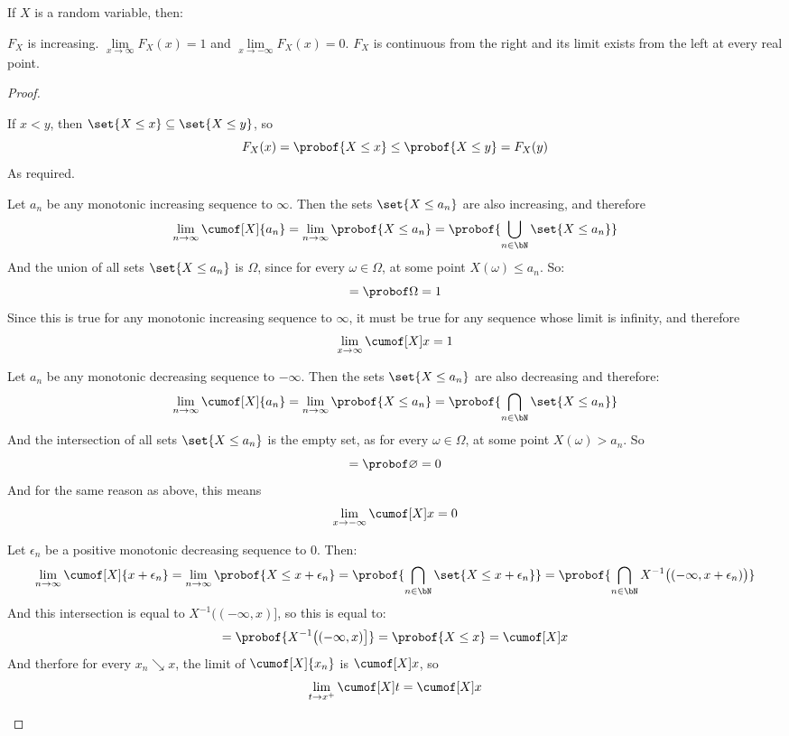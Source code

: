 \begin{prop*}

	If $X$ is a random variable, then:

	\begin{msecenumerate}
		\mitem $F_X$ is increasing.
		\mitem $\lim\limits_{x\to\infty} F_X(x)=1$ and $\lim\limits_{x\to-\infty} F_X(x)=0$.
		\mitem $F_X$ is continuous from the right and its limit exists from the left at every real point.
	\end{msecenumerate}

\end{prop*}

\begin{proof}

	\begin{msecenumerate}[0pt]
		\mitem If $x<y$, then $\set{X\leq x}\subseteq\set{X\leq y}$, so
			\[ F_X(x) = \probof{X\leq x} \leq \probof{X\leq y} = F_X(y) \]
			As required.

		\mitem Let $a_n$ be any monotonic increasing sequence to $\infty$.
			Then the sets $\set{X\leq a_n}$ are also increasing, and therefore
			\[ \lim_{n\to\infty} \cumof[X]{a_n} = \lim_{n\to\infty}\probof{X\leq a_n} = \probof{\bigcup_{n\in\bN}\set{X\leq a_n}} \]
			And the union of all sets $\set{X\leq a_n}$ is $\Omega$, since for every $\omega\in\Omega$, at some point $X(\omega)\leq a_n$.
			So:
			\[ = \probof\Omega = 1 \]
			Since this is true for any monotonic increasing sequence to $\infty$, it must be true for any sequence whose limit is infinity,
			and therefore
			\[ \lim_{x\to\infty} \cumof[X]x = 1 \]

			Let $a_n$ be any monotonic decreasing sequence to $-\infty$.
			Then the sets $\set{X\leq a_n}$ are also decreasing and therefore:
			\[ \lim_{n\to\infty}\cumof[X]{a_n} = \lim_{n\to\infty}\probof{X\leq a_n} = \probof{\bigcap_{n\in\bN}\set{X\leq a_n}} \]
			And the intersection of all sets $\set{X\leq a_n}$ is the empty set, as for every $\omega\in\Omega$, at some point $X(\omega)>a_n$.
			So
			\[ = \probof\varnothing = 0 \]
			And for the same reason as above, this means
			\[ \lim_{x\to-\infty}\cumof[X]x = 0 \]

		\mitem Let $\epsilon_n$ be a positive monotonic decreasing sequence to $0$.
			Then:
			\[ \lim_{n\to\infty}\cumof[X]{x+\epsilon_n} = \lim_{n\to\infty}\probof{X\leq x+\epsilon_n} =
			\probof{\bigcap_{n\in\bN}\set{X\leq x+\epsilon_n}} = \probof{\bigcap_{n\in\bN}X^{-1}\big((-\infty,x+\epsilon_n)\big)} \]
			And this intersection is equal to $X^{-1}\big((-\infty,x)\big]$, so this is equal to:
			\[ = \probof{X^{-1}\big((-\infty,x)\big]} = \probof{X\leq x} = \cumof[X]x \]
			And therfore for every $x_n\searrow x$, the limit of $\cumof[X]{x_n}$ is $\cumof[X]x$, so
			\[ \lim_{t\to x^+}\cumof[X]t = \cumof[X]x \]


\end{msecenumerate}
\end{proof}

